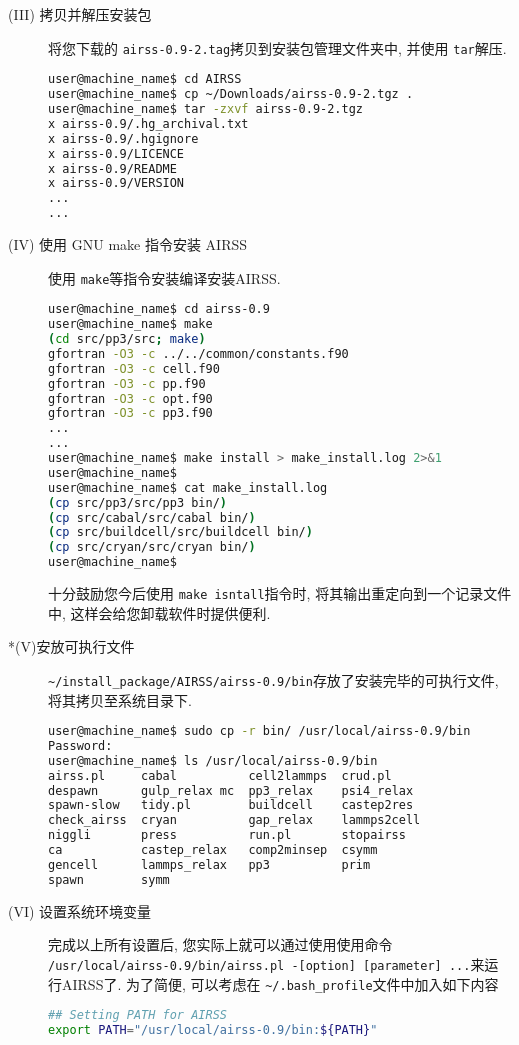 \documentclass[a4paper, 10pt]{article}
\begin{document}
\begin{description}
\item [(III) 拷贝并解压安装包] 将您下载的 \verb|airss-0.9-2.tag|拷贝到安装包管理文件夹中, 并使用 \verb|tar|解压.
\begin{lstlisting}[language={bash}]
user@machine_name$ cd AIRSS
user@machine_name$ cp ~/Downloads/airss-0.9-2.tgz .
user@machine_name$ tar -zxvf airss-0.9-2.tgz
x airss-0.9/.hg_archival.txt
x airss-0.9/.hgignore
x airss-0.9/LICENCE
x airss-0.9/README
x airss-0.9/VERSION 
...
...
\end{lstlisting}

\item[(IV) 使用 GNU make 指令安装 AIRSS] 使用 \verb|make|等指令安装编译安装AIRSS.
\begin{lstlisting}[language={bash}]
user@machine_name$ cd airss-0.9
user@machine_name$ make
(cd src/pp3/src; make)
gfortran -O3 -c ../../common/constants.f90
gfortran -O3 -c cell.f90
gfortran -O3 -c pp.f90
gfortran -O3 -c opt.f90
gfortran -O3 -c pp3.f90
...
...
user@machine_name$ make install > make_install.log 2>&1
user@machine_name$
user@machine_name$ cat make_install.log
(cp src/pp3/src/pp3 bin/)
(cp src/cabal/src/cabal bin/)
(cp src/buildcell/src/buildcell bin/)
(cp src/cryan/src/cryan bin/)
user@machine_name$
\end{lstlisting}

十分鼓励您今后使用 \verb|make isntall|指令时, 将其输出重定向到一个记录文件中, 这样会给您卸载软件时提供便利.

\item[*(V)安放可执行文件] \verb|~/install_package/AIRSS/airss-0.9/bin|存放了安装完毕的可执行文件, 将其拷贝至系统目录下.
\begin{lstlisting}[language={bash}]
user@machine_name$ sudo cp -r bin/ /usr/local/airss-0.9/bin
Password:
user@machine_name$ ls /usr/local/airss-0.9/bin
airss.pl     cabal          cell2lammps  crud.pl      
despawn      gulp_relax mc  pp3_relax    psi4_relax   
spawn-slow   tidy.pl        buildcell    castep2res   
check_airss  cryan          gap_relax    lammps2cell  
niggli       press          run.pl       stopairss    
ca           castep_relax   comp2minsep  csymm        
gencell      lammps_relax   pp3          prim         
spawn        symm

\end{lstlisting}

\item[(VI) 设置系统环境变量] 完成以上所有设置后, 您实际上就可以通过使用使用命令 \verb|/usr/local/airss-0.9/bin/airss.pl -[option] [parameter] ...|来运行AIRSS了. 为了简便, 可以考虑在 \verb|~/.bash_profile|文件中加入如下内容
\begin{lstlisting}[language={bash}]
## Setting PATH for AIRSS
export PATH="/usr/local/airss-0.9/bin:${PATH}"
\end{lstlisting}


\end{description}
\end{document}
